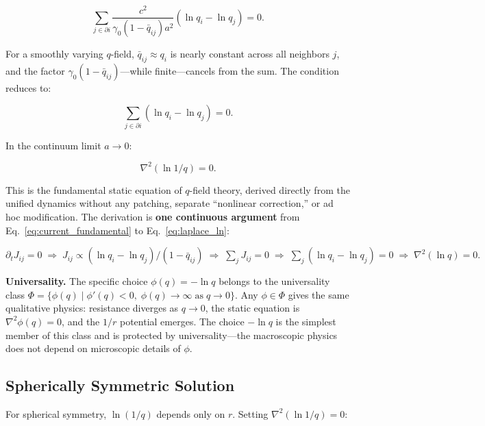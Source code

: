 \documentclass[aps,prd,twocolumn,showpacs,superscriptaddress,preprintnumbers]{revtex4-2}
\begin{document}
\begin{equation}
\sum_{j\in\partial i} \frac{c^2}{\gamma_0(1-\bar{q}_{ij})a^2}(\ln q_i - \ln q_j) = 0.
\label{eq:zero_net_current}
\end{equation}

For a smoothly varying $q$-field, $\bar{q}_{ij}\approx q_i$ is nearly constant across all neighbors $j$, and the factor $\gamma_0(1-\bar{q}_{ij})$---while finite---cancels from the sum.
The condition reduces to:

\begin{equation}
\sum_{j \in \partial i} (\ln q_i - \ln q_j) = 0.
\label{eq:laplace_ln_disc}
\end{equation}

In the continuum limit $a\to0$:

\begin{equation}
\boxed{\nabla^2(\ln 1/q) = 0}.
\label{eq:laplace_ln}
\end{equation}

This is the fundamental static equation of $q$-field theory, derived directly from the unified dynamics without any patching, separate ``nonlinear correction,'' or ad hoc modification.
The derivation is \textbf{one continuous argument} from Eq.~\eqref{eq:current_fundamental} to Eq.~\eqref{eq:laplace_ln}:

\begin{center}
\small
$\partial_t J_{ij}=0 \;\Rightarrow\; J_{ij} \propto (\ln q_i-\ln q_j)/(1-\bar{q}_{ij}) \;\Rightarrow\; \sum_j J_{ij}=0 \;\Rightarrow\; \sum_j(\ln q_i-\ln q_j)=0 \;\Rightarrow\; \nabla^2(\ln q)=0.$
\end{center}

\textbf{Universality.}
The specific choice $\phi(q)=-\ln q$ belongs to the universality class $\Phi=\{\phi(q) \mid \phi'(q)<0,\;\phi(q)\to\infty\;\text{as}\;q\to0\}$.
Any $\phi\in\Phi$ gives the same qualitative physics: resistance diverges as $q\to0$, the static equation is $\nabla^2\phi(q)=0$, and the $1/r$ potential emerges.
The choice $-\ln q$ is the simplest member of this class and is protected by universality---the macroscopic physics does not depend on microscopic details of $\phi$.

\subsection{Spherically Symmetric Solution}

For spherical symmetry, $\ln(1/q)$ depends only on $r$.
Setting $\nabla^2(\ln 1/q)=0$:
\end{document}
